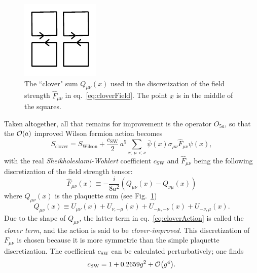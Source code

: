 \begin{figure}
  \centering
  \includegraphics[width=0.5\linewidth]{figs/clover.pdf}
  \caption{The ``clover" sum $Q_{\mu\nu}(x)$ used in the discretization of the
           field strength $\hat{F}_{\mu\nu}$ in eq.~\eqref{eq:cloverField}.
           The point $x$ is in the middle of the squares.}
           
  \label{fig:clover}
\end{figure}

Taken altogether, all that remains for improvement is the operator $O_{5a}$,
so that the $\order{a}$ improved Wilson fermion action becomes
\begin{equation}\label{eq:cloverAction}
  S_\text{clover}=S_\text{Wilson}+\frac{c_\text{SW}}{2}
               \,a^5\sum_{x;\,\mu<\nu}\bar{\psi}(x)
                  \sigma_{\mu\nu}\hat{F}_{\mu\nu}\psi(x),
\end{equation}
with the real {\it Sheikholeslami-Wohlert} coefficient $c_\text{SW}$
\cite{sheikholeslami_improved_1985} and $\hat{F}_{\mu\nu}$ being the
following discretization of the field strength tensor:
\begin{equation}\label{eq:cloverField}
  \hat{F}_{\mu\nu}(x)\equiv
    -\frac{i}{8a^2}\left(Q_{\mu\nu}(x)-Q_{\nu\mu}(x)\right)
\end{equation}
where $Q_{\mu\nu}(x)$ is the plaquette sum (see Fig.~\ref{fig:clover})
\begin{equation}
  Q_{\mu\nu}(x)\equiv U_{\mu\nu}(x)+U_{\nu,-\mu}(x)
                 +U_{-\mu,-\nu}(x)+U_{-\nu,\mu}(x).
\end{equation}
Due to the shape of $Q_{\mu\nu}$, the latter term in 
eq.~\eqref{eq:cloverAction} is called the {\it clover term}, and the
action is said to be {\it clover-improved}.
This discretization of $F_{\mu\nu}$ is chosen because it is more
symmetric than the simple plaquette discretization.
The coefficient $c_\text{SW}$ can be calculated perturbatively; one finds
\cite{sheikholeslami_improved_1985}
\begin{equation}
  c_\text{SW}=1+0.2659 g^2+\order{g^4}.
\end{equation} 

